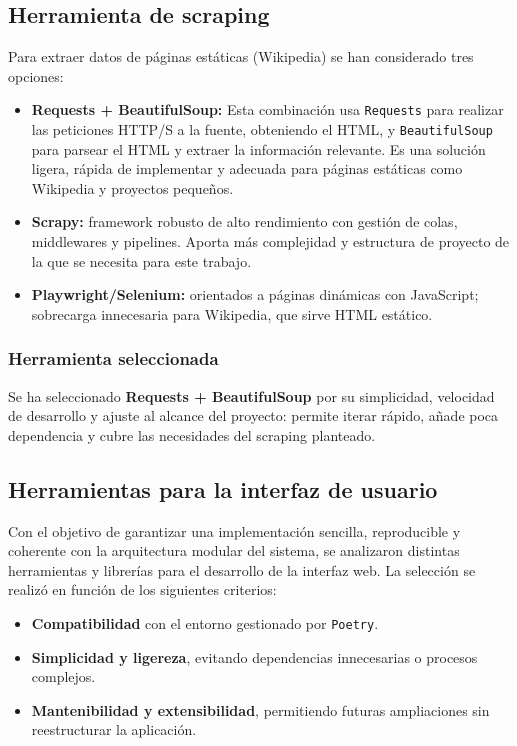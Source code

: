 \subsection{Herramienta de scraping}\label{sec:scraping}
Para extraer datos de páginas estáticas (Wikipedia) se han considerado tres opciones:

\begin{itemize}
  \item \textbf{Requests + BeautifulSoup:} Esta combinación usa \texttt{Requests} para realizar las peticiones 
  HTTP/S a la fuente, obteniendo el HTML, y \texttt{BeautifulSoup} para parsear el HTML y extraer la información 
  relevante. Es una solución ligera, rápida de implementar y adecuada para páginas estáticas como Wikipedia y
  proyectos pequeños.
  \item \textbf{Scrapy:} framework robusto de alto rendimiento con gestión de colas, middlewares y pipelines.
  Aporta más complejidad y estructura de proyecto de la que se necesita para este trabajo.
  \item \textbf{Playwright/Selenium:} orientados a páginas dinámicas con JavaScript; sobrecarga innecesaria para 
  Wikipedia, que sirve HTML estático.
\end{itemize}

\subsubsection{Herramienta seleccionada}
Se ha seleccionado \textbf{Requests + BeautifulSoup} por su simplicidad, velocidad de desarrollo y ajuste al alcance 
del proyecto: permite iterar rápido, añade poca dependencia y cubre las necesidades del scraping planteado.

\subsection{Herramientas para la interfaz de usuario} \label{sec:interfaz-herramientas}
Con el objetivo de garantizar una implementación sencilla, reproducible y coherente con la arquitectura modular del sistema, 
se analizaron distintas herramientas y librerías para el desarrollo de la interfaz web. La selección se realizó en función 
de los siguientes criterios:

\begin{itemize}
    \item \textbf{Compatibilidad} con el entorno gestionado por \texttt{Poetry}.
    \item \textbf{Simplicidad y ligereza}, evitando dependencias innecesarias o procesos complejos.
    \item \textbf{Mantenibilidad y extensibilidad}, permitiendo futuras ampliaciones sin reestructurar la aplicación.
\end{itemize}

